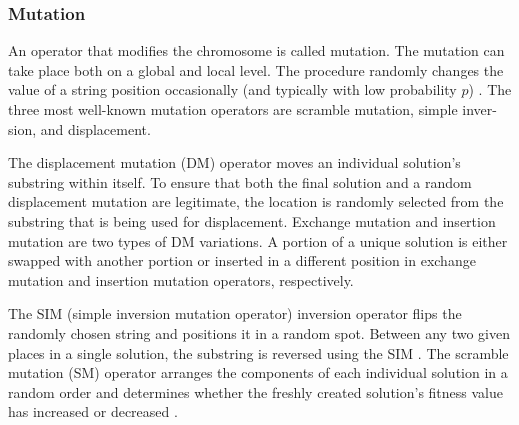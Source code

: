 \subsubsection{Mutation}
An operator that modifies the chromosome is called mutation. The mutation can take place both on a global and local level. The procedure randomly changes the value of a string position occasionally (and typically with low probability $p$) \citep{Tang1996}. The three most well-known mutation operators are scramble mutation, simple inver-sion, and displacement.\par
The displacement mutation (DM) operator moves an individual solution's substring within itself. To ensure that both the final solution and a random displacement mutation are legitimate, the location is randomly selected from the substring that is being used for displacement. Exchange mutation and insertion mutation are two types of DM variations. A portion of a unique solution is either swapped with another portion or inserted in a different position in exchange mutation and insertion mutation operators, respectively. \citep{Jebari}\par
The SIM (simple inversion mutation operator) inversion operator flips the randomly chosen string and positions it in a random spot. Between any two given places in a single solution, the substring is reversed using the SIM \citep{Jebari}. The scramble mutation (SM) operator arranges the components of each individual solution in a random order and determines whether the freshly created solution's fitness value has increased or decreased \citep{Jebari}.